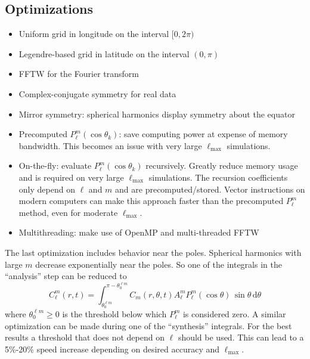 \documentclass[10pt,letterpaper]{article}
\begin{document}
\subsection{Optimizations}
\begin{itemize}
  \item Uniform grid in longitude on the interval $[0,2\pi)$
  \item Legendre-based grid in latitude on the interval $(0,\pi)$
  \item FFTW for the Fourier transform
  \item Complex-conjugate symmetry for real data
  \item Mirror symmetry: spherical harmonics display symmetry about the equator
  \item Precomputed $P_\ell^m\left(\cos\theta_k\right)$: save computing power
        at expense of memory bandwidth. This becomes an issue with very large
        $\ell_\mathrm{max}$ simulations.
  \item On-the-fly: evaluate $P_\ell^m\left(\cos\theta_k\right)$ recursively.
        Greatly reduce memory usage and is required
        on very large $\ell_\mathrm{max}$ simulations.
        The recursion coefficients only depend on $\ell$ and $m$ and are
        precomputed/stored. Vector instructions on modern computers can make this
        approach faster than the precomputed $P_\ell^m$ method, even for moderate
        $\ell_\mathrm{max}$.
  \item Multithreading: make use of OpenMP and multi-threaded FFTW
\end{itemize}
The last optimization includes behavior near the poles. Spherical harmonics with
large $m$ decrease exponentially near the poles. So one of the integrals in the
``analysis'' step can be reduced to
\begin{equation}
  C_\ell^m\left(r,t\right) =
                  \int_{\theta_0^{\ell m}}^{\pi-\theta_0^{\ell m}}
              C_m\left(r,\theta,t\right)A_\ell^mP_\ell^m\left(\cos\theta\right)
                  \,\sin\theta\,\mathrm{d}\theta
\end{equation}
where $\theta_0^{\ell m} \geq 0$ is the threshold below which $P_\ell^m$ is considered
zero. A similar optimization can be made during one of the ``synthesis'' integrals.
For the best results a threshold that does not depend on $\ell$ should be used. This
can lead to a 5\%-20\% speed increase depending on desired accuracy and $\ell_\mathrm{max}$.
        
\end{document}
